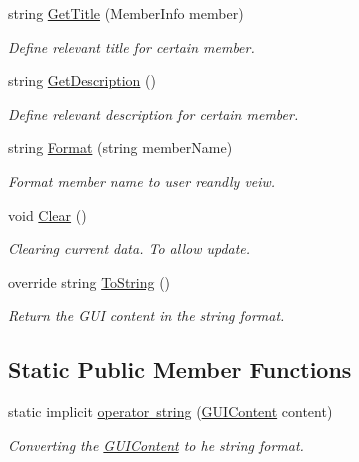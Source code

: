 \begin{DoxyCompactItemize}
string \mbox{\hyperlink{class_wpf_handler_1_1_u_i_1_1_g_u_i_content_a36c48561703ca7b73f21187ee9ff08bb}{Get\+Title}} (Member\+Info member)
\begin{DoxyCompactList}\small\item\em Define relevant title for certain member. \end{DoxyCompactList}\item 
string \mbox{\hyperlink{class_wpf_handler_1_1_u_i_1_1_g_u_i_content_a98ca8cae768fad4160df1aba48d6f7f6}{Get\+Description}} ()
\begin{DoxyCompactList}\small\item\em Define relevant description for certain member. \end{DoxyCompactList}\item 
string \mbox{\hyperlink{class_wpf_handler_1_1_u_i_1_1_g_u_i_content_ad37327acd55ad09e036f284970d1e022}{Format}} (string member\+Name)
\begin{DoxyCompactList}\small\item\em Format member name to user reandly veiw. \end{DoxyCompactList}\item 
void \mbox{\hyperlink{class_wpf_handler_1_1_u_i_1_1_g_u_i_content_ae691340b5a25a5497d9f64d4b0adddd6}{Clear}} ()
\begin{DoxyCompactList}\small\item\em Clearing current data. To allow update. \end{DoxyCompactList}\item 
override string \mbox{\hyperlink{class_wpf_handler_1_1_u_i_1_1_g_u_i_content_ae38dd5281ee8568b040af4c1d14322c4}{To\+String}} ()
\begin{DoxyCompactList}\small\item\em Return the G\+UI content in the string format. \end{DoxyCompactList}\end{DoxyCompactItemize}
\subsection*{Static Public Member Functions}
\begin{DoxyCompactItemize}
\item 
static implicit \mbox{\hyperlink{class_wpf_handler_1_1_u_i_1_1_g_u_i_content_a0a59156d78345550a413d155791e1137}{operator string}} (\mbox{\hyperlink{class_wpf_handler_1_1_u_i_1_1_g_u_i_content}{G\+U\+I\+Content}} content)
\begin{DoxyCompactList}\small\item\em Converting the \mbox{\hyperlink{class_wpf_handler_1_1_u_i_1_1_g_u_i_content}{G\+U\+I\+Content}} to he string format. \end{DoxyCompactList}\end{DoxyCompactItemize}
